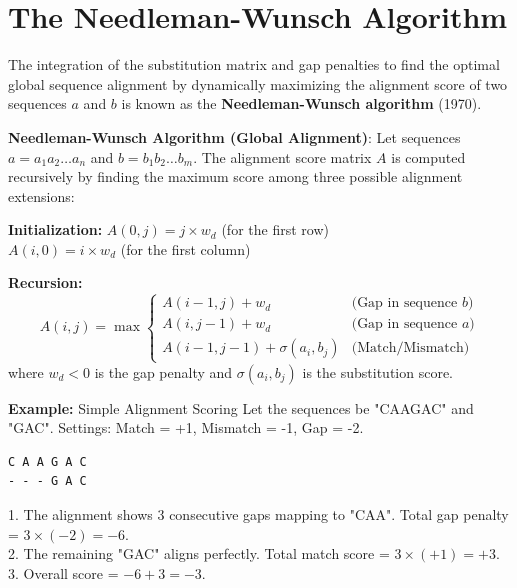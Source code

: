 \section{The Needleman-Wunsch Algorithm}
The integration of the substitution matrix and gap penalties to find the optimal global sequence alignment by dynamically maximizing the alignment score of two sequences $a$ and $b$ is known as the \textbf{Needleman-Wunsch algorithm} (1970).

\begin{important}
  \textbf{Needleman-Wunsch Algorithm (Global Alignment)}:
  Let sequences $a = a_1a_2\dots a_n$ and $b = b_1b_2\dots b_m$. The alignment score matrix $A$ is computed recursively by finding the maximum score among three possible alignment extensions:
  
  \textbf{Initialization:}
  $A(0, j) = j \times w_d$ (for the first row) \\
  $A(i, 0) = i \times w_d$ (for the first column)
  
  \textbf{Recursion:}
  \begin{equation}
  A(i, j) = \max \begin{cases} 
  A(i-1, j) + w_d & \text{(Gap in sequence } b \text{)} \\
  A(i, j-1) + w_d & \text{(Gap in sequence } a \text{)} \\
  A(i-1, j-1) + \sigma(a_i, b_j) & \text{(Match/Mismatch)}
  \end{cases}
  \label{eq:needleman}
  \end{equation}
  where $w_d < 0$ is the gap penalty and $\sigma(a_i, b_j)$ is the substitution score.
\end{important}

\textbf{Example:} Simple Alignment Scoring
Let the sequences be "CAAGAC" and "GAC". 
Settings: Match = +1, Mismatch = -1, Gap = -2.
\begin{verbatim}
C A A G A C
- - - G A C
\end{verbatim}
1. The alignment shows 3 consecutive gaps mapping to "CAA". Total gap penalty = $3 \times (-2) = -6$.\\
2. The remaining "GAC" aligns perfectly. Total match score = $3 \times (+1) = +3$.\\
3. Overall score = $-6 + 3 = -3$.

